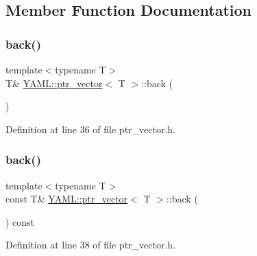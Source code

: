 \subsection{Member Function Documentation}
\mbox{\label{class_y_a_m_l_1_1ptr__vector_a6c649d57bf7251486a34e89a0fb4b0be}} 
\subsubsection{\texorpdfstring{back()}{back()}\hspace{0.1cm}{\footnotesize\ttfamily [1/2]}}
{\footnotesize\ttfamily template$<$typename T$>$ \\
T\& \mbox{\hyperlink{class_y_a_m_l_1_1ptr__vector}{Y\+A\+M\+L\+::ptr\+\_\+vector}}$<$ T $>$\+::back (\begin{DoxyParamCaption}{ }\end{DoxyParamCaption})\hspace{0.3cm}{\ttfamily [inline]}}



Definition at line 36 of file ptr\+\_\+vector.\+h.

\mbox{\label{class_y_a_m_l_1_1ptr__vector_ab99aea297d04fc5133f5695e13006bea}} 
\subsubsection{\texorpdfstring{back()}{back()}\hspace{0.1cm}{\footnotesize\ttfamily [2/2]}}
{\footnotesize\ttfamily template$<$typename T$>$ \\
const T\& \mbox{\hyperlink{class_y_a_m_l_1_1ptr__vector}{Y\+A\+M\+L\+::ptr\+\_\+vector}}$<$ T $>$\+::back (\begin{DoxyParamCaption}{ }\end{DoxyParamCaption}) const\hspace{0.3cm}{\ttfamily [inline]}}



Definition at line 38 of file ptr\+\_\+vector.\+h.

\mbox{\label{class_y_a_m_l_1_1ptr__vector_a7ee95eb6be5454a6ba9031387c8881de}} 
